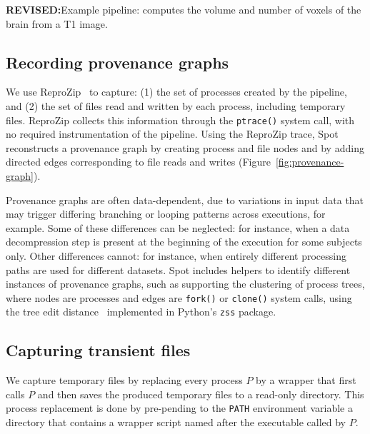 \documentclass[a4paper,num-refs]{oup-contemporary}
\newcommand{\revised}[1]{\color{blue}\textbf{REVISED:}#1\color{black}}
\newcommand{\reprozip}[0]{ReproZip\xspace}
\newcommand{\toolname}[0]{Spot\xspace}
\begin{document}
\begin{listing}
  \inputminted{bash}{"data/example/example.sh"}
  \caption{\revised{Example pipeline: computes the volume and number 
  of voxels of the brain from a T1 image.}}
  \label{listing:sample-script}
\end{listing}

\subsection{Recording provenance graphs}

We use \reprozip~\cite{rampin2016reprozip}
to capture: (1) the set of processes created by the
pipeline, and
(2) the set of files read and written by each process, including
temporary files. \reprozip collects this information through the
\texttt{ptrace()} system call, with no required instrumentation of the pipeline.
Using the \reprozip trace, \toolname reconstructs a provenance graph by creating process and file
nodes and by adding directed edges corresponding
to file reads and writes (Figure~\ref{fig:provenance-graph}).

Provenance graphs are often data-dependent, due to variations in input data that
may trigger differing branching or looping patterns across executions, for example.
Some of these differences can be neglected: for instance, when a data
decompression step is present at the beginning of the execution for some
subjects only. Other differences cannot: for instance, when entirely
different processing paths are used for different datasets. \toolname
includes helpers to identify different instances of provenance graphs, 
such as supporting the clustering of process trees, where nodes are processes and
edges are \texttt{fork()} or \texttt{clone()} system calls, using the tree
edit distance~\cite{zhang1989simple} implemented in Python's \texttt{zss} package.

\subsection{Capturing transient files}

We capture temporary files by replacing every
process $P$ by a wrapper that first calls $P$ and then saves the produced
temporary files to a read-only directory. This process replacement is done by pre-pending
 to the \texttt{PATH} environment
variable a directory that contains a wrapper script named after the executable
called by $P$.
\end{document}
